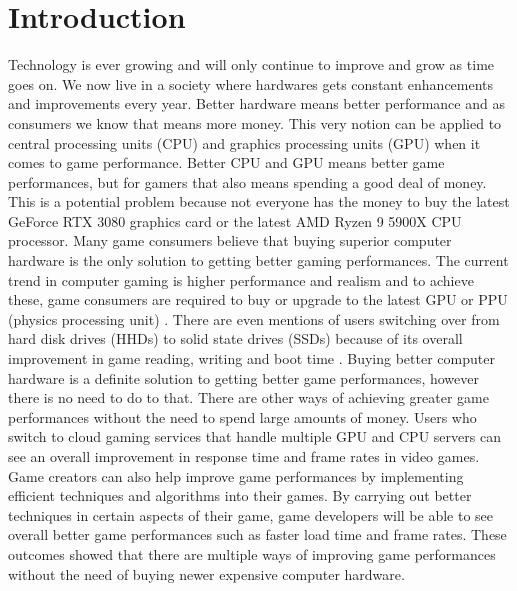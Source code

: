\documentclass{article}
\begin{document}
\section{Introduction}
Technology is ever growing and will only continue to improve and grow as time goes on. We now live in a society where hardwares gets constant enhancements and improvements every year. Better hardware means better performance and as consumers we know that means more money. This very notion can be applied to central processing units (CPU) and graphics processing units (GPU) when it comes to game performance. Better CPU and GPU means better game performances, but for gamers that also means spending a good deal of money. This is a potential problem because not everyone has the money to buy the latest GeForce RTX 3080 graphics card or the latest AMD Ryzen 9 5900X CPU processor. Many game consumers believe that buying superior computer hardware is the only solution to getting better gaming performances. The current trend in computer gaming is higher performance and realism and to achieve these, game consumers are required to buy or upgrade to the latest GPU or PPU (physics processing unit) \cite{1673322}. There are even mentions of users switching over from hard disk drives (HHDs) to solid state drives (SSDs) because of its overall improvement in game reading, writing and boot time \cite{10.5555/2157848.2157852}. Buying better computer hardware is a definite solution to getting better game performances, however there is no need to do to that. There are other ways of achieving greater game performances without the need to spend large amounts of money. Users who switch to cloud gaming services that handle multiple GPU and CPU servers can see an overall improvement in response time and frame rates in video games. Game creators can also help improve game performances by implementing efficient techniques and algorithms into their games. By carrying out better techniques in certain aspects of their game, game developers will be able to see overall better game performances such as faster load time and frame rates. These outcomes showed that there are multiple ways of improving game performances without the need of buying newer expensive computer hardware.  
\end{document}
